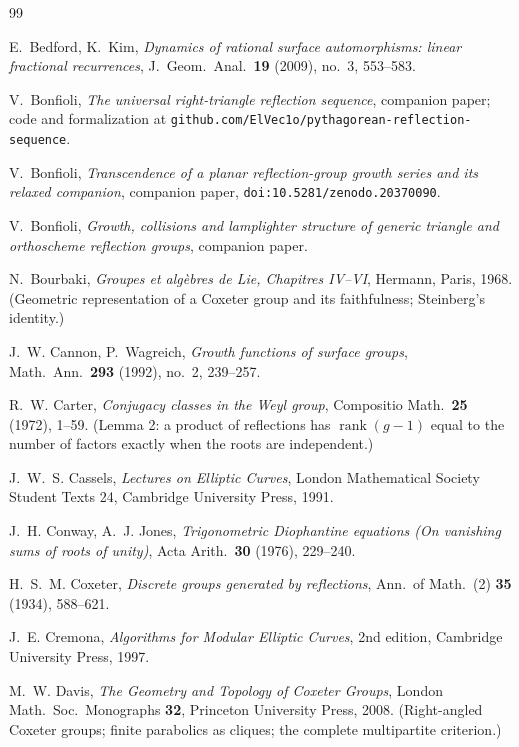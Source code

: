 \documentclass[11pt,a4paper]{article}
\theoremstyle{definition}
\theoremstyle{remark}
\theoremstyle{plain}
\begin{document}
\begin{thebibliography}{99}

E.~Bedford, K.~Kim, \emph{Dynamics of rational surface automorphisms: linear fractional
recurrences}, J.\ Geom.\ Anal.\ \textbf{19} (2009), no.~3, 553--583.

V.~Bonfioli, \emph{The universal right-triangle reflection sequence}, companion paper; code and
formalization at \texttt{github.com/ElVec1o/pythagorean-reflection-sequence}.

V.~Bonfioli, \emph{Transcendence of a planar reflection-group growth series and its relaxed
companion}, companion paper, \texttt{doi:10.5281/zenodo.20370090}.

V.~Bonfioli, \emph{Growth, collisions and lamplighter structure of generic triangle and
orthoscheme reflection groups}, companion paper.

N.~Bourbaki, \emph{Groupes et alg\`ebres de Lie, Chapitres IV--VI}, Hermann, Paris, 1968.
(Geometric representation of a Coxeter group and its faithfulness; Steinberg's identity.)

J.~W. Cannon, P.~Wagreich, \emph{Growth functions of surface groups}, Math.\ Ann.\ \textbf{293}
(1992), no.~2, 239--257.

R.~W. Carter, \emph{Conjugacy classes in the Weyl group}, Compositio Math.\ \textbf{25} (1972),
1--59. (Lemma 2: a product of reflections has $\operatorname{rank}(g-1)$ equal to the number of
factors exactly when the roots are independent.)

J.~W.~S. Cassels, \emph{Lectures on Elliptic Curves}, London Mathematical Society Student Texts
24, Cambridge University Press, 1991.

J.~H. Conway, A.~J. Jones, \emph{Trigonometric Diophantine equations (On vanishing sums of roots
of unity)}, Acta Arith.\ \textbf{30} (1976), 229--240.

H.~S.~M. Coxeter, \emph{Discrete groups generated by reflections}, Ann.\ of Math.\ (2)
\textbf{35} (1934), 588--621.

J.~E. Cremona, \emph{Algorithms for Modular Elliptic Curves}, 2nd edition, Cambridge University
Press, 1997.

M.~W. Davis, \emph{The Geometry and Topology of Coxeter Groups}, London Math.\ Soc.\ Monographs
\textbf{32}, Princeton University Press, 2008. (Right-angled Coxeter groups; finite parabolics
as cliques; the complete multipartite criterion.)


\end{thebibliography}
\end{document}

